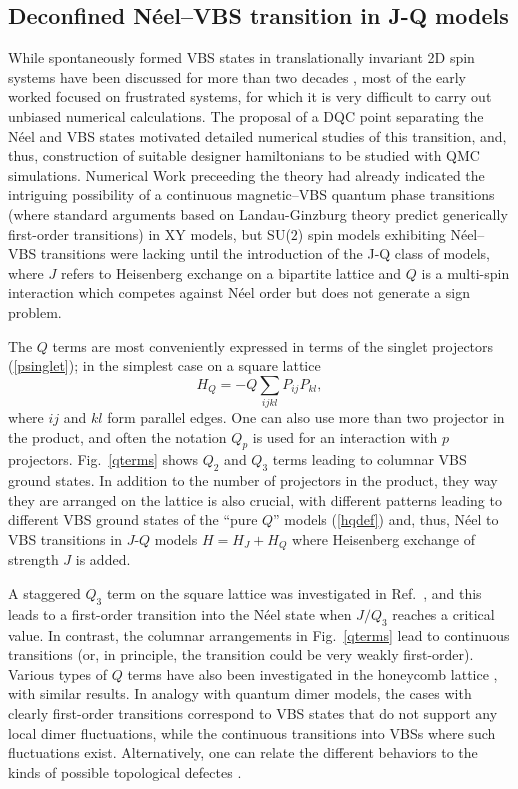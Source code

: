 \documentclass[range]{ar2e}
\begin{document}
\subsection{Deconfined N\'eel--VBS transition in J-Q models}
\label{ss:jq2}
While spontaneously formed VBS states in translationally invariant 2D spin systems have been discussed for more than two decades \cite{Chandra88,Dagotto89,Read89},
most of the early worked focused on frustrated systems, for which it is very difficult to carry out unbiased numerical calculations. The proposal of a DQC 
point separating the N\'eel and VBS states motivated detailed numerical studies of this transition, and, thus, construction of suitable designer 
hamiltonians to be studied with QMC simulations. Numerical Work preceeding the theory \cite{Sandvik02} had already indicated the intriguing possibility of 
a continuous magnetic--VBS quantum phase transitions (where standard arguments based on Landau-Ginzburg theory predict generically first-order transitions) in
XY models, but SU($2$) spin models exhibiting N\'eel--VBS transitions were lacking until the introduction of the J-Q class of models, where $J$ refers to 
Heisenberg exchange on a bipartite lattice and $Q$ is a multi-spin interaction which competes against N\'eel order but does not generate a sign problem. 

The $Q$ terms are most conveniently expressed in terms of the singlet projectors (\ref{psinglet}); in the simplest case on a square lattice
\begin{equation}
H_Q = - Q\sum_{ijkl} P_{ij}P_{kl},
\label{hqdef}
\end{equation}
where $ij$ and $kl$ form parallel edges. One can also use more than two projector in the product, and often the notation $Q_p$ is used for an 
interaction with $p$ projectors. Fig.~\ref{qterms} shows $Q_2$ and $Q_3$ terms leading to columnar VBS ground states. In addition to the number
of projectors in the product, they way they are arranged on the lattice is also crucial, with different patterns leading to different VBS ground
states of the ``pure $Q$'' models (\ref{hqdef}) and, thus, N\'eel to VBS transitions in $J$-$Q$ models $H=H_J+H_Q$ where Heisenberg exchange of
strength $J$ is added.

A staggered $Q_3$ term on the square lattice was investigated in Ref.~\cite{Sen10}, and this leads to a first-order transition into the N\'eel state 
when $J/Q_3$ reaches a critical value. In contrast, the columnar arrangements in Fig.~\ref{qterms} lead to continuous transitions (or, in principle,
the transition could be very weakly first-order). Various types of $Q$ terms have also been investigated in the honeycomb lattice \cite{Banerjee11}, 
with similar results. In analogy with quantum dimer models, the cases with clearly first-order transitions correspond to VBS states that do not
support any local dimer fluctuations, while the continuous transitions into VBSs where such fluctuations exist. Alternatively, one can relate
the different behaviors to the kinds of possible topological defectes \cite{Banerjee11}.
\end{document}
